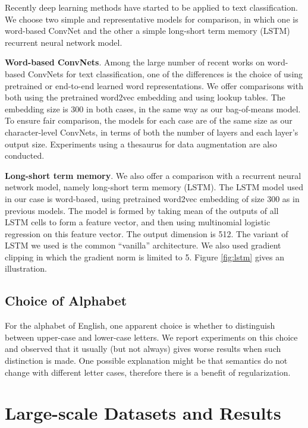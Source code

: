 Recently deep learning methods have started to be applied to text classification. We choose two simple and representative models for comparison, in which one is word-based ConvNet and the other a simple long-short term memory (LSTM)\cite{HS97} recurrent neural network model.

\textbf{Word-based ConvNets}. Among the large number of recent works on word-based ConvNets for text classification, one of the differences is the choice of using pretrained or end-to-end learned word representations. We offer comparisons with both using the pretrained word2vec\cite{MSCCD13} embedding\cite{K14} and using lookup tables\cite{CWB11}. The embedding size is 300 in both cases, in the same way as our bag-of-means model. To ensure fair comparison, the models for each case are of the same size as our character-level ConvNets, in terms of both the number of layers and each layer's output size. Experiments using a thesaurus for data augmentation are also conducted.

\textbf{Long-short term memory}. We also offer a comparison with a recurrent neural network model, namely long-short term memory (LSTM)\cite{HS97}. The LSTM model used in our case is word-based, using pretrained word2vec embedding of size 300 as in previous models. The model is formed by taking mean of the outputs of all LSTM cells to form a feature vector, and then using multinomial logistic regression on this feature vector. The output dimension is 512. The variant of LSTM we used is the common ``vanilla'' architecture\cite{GS05}\cite{GSKSS15}. We also used gradient clipping\cite{PMB13} in which the gradient norm is limited to 5. Figure \ref{fig:lstm} gives an illustration.

\subsection{Choice of Alphabet}

For the alphabet of English, one apparent choice is whether to distinguish between upper-case and lower-case letters. We report experiments on this choice and observed that it usually (but not always) gives worse results when such distinction is made. One possible explanation might be that semantics do not change with different letter cases, therefore there is a benefit of regularization.

\section{Large-scale Datasets and Results}

